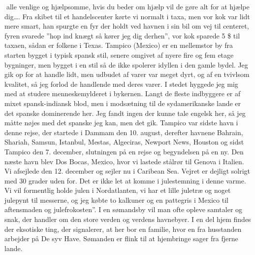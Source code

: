 alle venlige og hjælpsomme, hvis du beder om hjælp vil de gøre alt for
at hjælpe dig\ldots{}. Fra skibet til et handelscenter kørte vi normalt
i taxa, men vor kok var lidt mere smart, han spurgte en fyr der holdt
ved havnen i sin bil om vej til centeret, fyren svarede ''hop ind knægt
så kører jeg dig derhen'', vor kok sparede 5 \$ til taxaen, sådan er
folkene i Texas. Tampico (Mexico) er en mellemstor by fra starten bygget
i typisk spansk stil, senere omgivet af nyere fire og fem etage
bygninger, men bygget i en stil så de ikke spolerer idyllen i den gamle
bydel. Jeg gik op for at handle lidt, men udbudet af varer var meget
dyrt, og af en tvivlsom kvalitet, så jeg forlod de handlende med deres
varer. I stedet hyggede jeg mig med at studere menneskemylderet i
bykernen. Langt de fleste indbyggere er af mixet spansk-indiansk blod,
men i modsætning til de sydamerikanske lande er det spanske dominerende
her. Jeg fandt ingen der kunne tale engelsk her, så jeg måtte nøjes med
det spanske jeg kan, men det gik. Tampico var sidste havn i denne rejse,
der startede i Dammam den 10. august, derefter havnene Bahrain, Shariah,
Samsun, Istanbul, Mestas, Algeciras, Newport News, Houston og sidst
Tampico den 7. december, slutningen på en rejse og begyndelsen på en ny.
Den næste havn blev Dos Bocas, Mexico, hvor vi lastede stålrør til
Genova i Italien. Vi afsejlede den 12. december og sejler nu i Caribean
Sea. Vejret er dejligt solrigt med 30 grader uden for. Det er ikke let
at komme i julestemning i denne varme. Vi vil formentlig holde julen i
Nordatlanten, vi har et lille juletræ og noget julepynt til messerne, og
jeg købte to kalkuner og en pattegris i Mexico til aftensmaden og
julefrokosten''. I en sømandsby vil man ofte opleve samtaler og snak,
der handler om den store verden og verdens havnebyer. I en del hjem
findes der eksotiske ting, der signalerer, at her bor en familie, hvor
en fra husstanden arbejder på De syv Have. Sømanden er flink til at
hjembringe sager fra fjerne lande.

